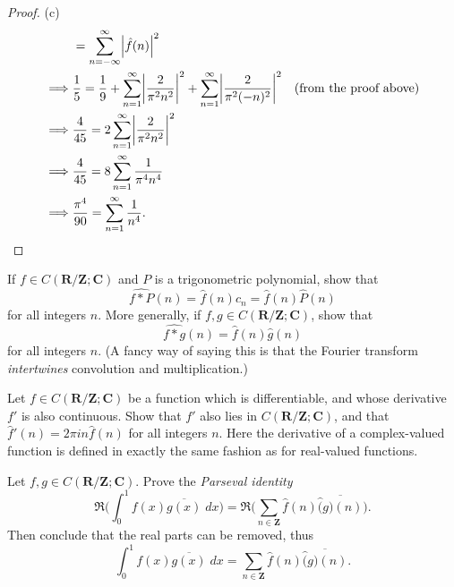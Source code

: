 \begin{proof}{(c)}
\begin{align*}
                 & = \sum_{n = -\infty}^\infty \abs*{\hat{f}(n)}^2                                                                                                                      \\
        \implies & \frac{1}{5} = \frac{1}{9} + \sum_{n = 1}^\infty \abs*{\frac{2}{\pi^2 n^2}}^2 + \sum_{n = 1}^\infty \abs*{\frac{2}{\pi^2 (-n)^2}}^2 & \text{(from the proof above)}   \\
        \implies & \frac{4}{45} = 2 \sum_{n = 1}^\infty \abs*{\frac{2}{\pi^2 n^2}}^2                                                                                                    \\
        \implies & \frac{4}{45} = 8 \sum_{n = 1}^\infty \frac{1}{\pi^4 n^4}                                                                                                             \\
        \implies & \frac{\pi^4}{90} = \sum_{n = 1}^\infty \frac{1}{n^4}.
    \end{align*}
\end{proof}

\begin{exercise}\label{ex 5.5.3}
    If \(f \in C(\mathbf{R} / \mathbf{Z} ; \mathbf{C})\) and \(P\) is a trigonometric polynomial, show that
    \[
        \hat{f * P}(n) = \hat{f}(n) c_n = \hat{f}(n) \hat{P}(n)
    \]
    for all integers \(n\).
    More generally, if \(f, g \in C(\mathbf{R} / \mathbf{Z} ; \mathbf{C})\), show that
    \[
        \hat{f * g}(n) = \hat{f}(n) \hat{g}(n)
    \]
    for all integers \(n\).
    (A fancy way of saying this is that the Fourier transform \emph{intertwines} convolution and multiplication.)
\end{exercise}

\begin{exercise}\label{ex 5.5.4}
    Let \(f \in C(\mathbf{R} / \mathbf{Z} ; \mathbf{C})\) be a function which is differentiable, and whose derivative \(f'\) is also continuous.
    Show that \(f'\) also lies in \(C(\mathbf{R} / \mathbf{Z} ; \mathbf{C})\), and that \(\hat{f}'(n) = 2 \pi i n \hat{f}(n)\) for all integers \(n\).
    Here the derivative of a complex-valued function is defined in exactly the same fashion as for real-valued functions.
\end{exercise}

\begin{exercise}\label{ex 5.5.5}
    Let \(f, g \in C(\mathbf{R} / \mathbf{Z} ; \mathbf{C})\).
    Prove the \emph{Parseval identity}
    \[
        \Re\bigg(\int_0^1 f(x) \overline{g(x)} \; dx\bigg) = \Re\bigg(\sum_{n \in \mathbf{Z}} \hat{f}(n) \overline{\hat(g)(n)}\bigg).
    \]
    Then conclude that the real parts can be removed, thus
    \[
        \int_0^1 f(x) \overline{g(x)} \; dx = \sum_{n \in \mathbf{Z}} \hat{f}(n) \overline{\hat(g)(n)}.
    \]
\end{exercise}

